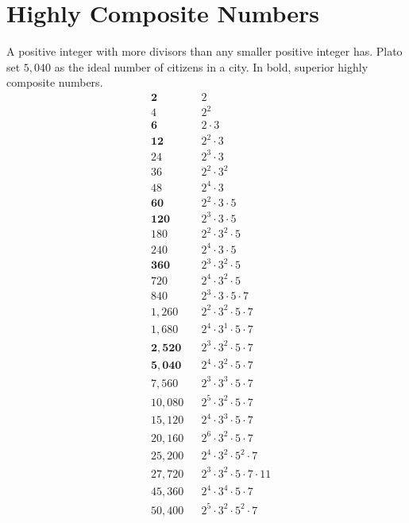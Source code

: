 \documentclass[12pt]{article}
\begin{document}
\newpage
\section*{Highly Composite Numbers}
A positive integer with more divisors than any smaller positive integer has.  Plato set $5,040$ as the ideal number of citizens in a city. In bold, superior highly composite numbers.  
\begin{align*}
& \bm{2}       &&	2\\
& 4 	         && 2^{2}\\
& \bm{6}       && 2 \cdot 3\\
& \bm{12}      && 2^{2} \cdot 3\\
& 24 	         && 2^{3} \cdot 3 \\
& 36 	         && 2^{2} \cdot 3^{2} \\
& 48 	         && 2^{4} \cdot 3 \\
& \bm{60}	     && 2^{2} \cdot 3 \cdot 5\\
& \bm{120}     && 2^{3} \cdot 3 \cdot 5\\
& 180          && 2^{2} \cdot 3^{2} \cdot 5\\
& 240 	       && 2^{4} \cdot 3 \cdot 5\\
& \bm{360}     && 2^{3} \cdot 3^{2} \cdot 5\\
& 720 	       && 2^{4} \cdot 3^{2} \cdot 5\\
& 840 	       && 2^{3} \cdot 3 \cdot 5 \cdot 7\\
& 1,260 	     && 2^{2} \cdot 3^{2} \cdot 5 \cdot 7\\
& 1,680 	     && 2^{4} \cdot 3^{1} \cdot 5 \cdot 7\\
& \bm{2,520}   && 2^{3} \cdot 3^{2} \cdot 5 \cdot 7\\
& \bm{5,040}   && 2^{4} \cdot 3^{2} \cdot 5 \cdot 7\\
& 7,560 	     && 2^{3} \cdot 3^{3} \cdot 5 \cdot 7\\
& 10,080       && 2^{5} \cdot 3^{2} \cdot 5 \cdot 7\\
& 15,120	     && 2^{4} \cdot 3^{3} \cdot 5 \cdot 7\\
& 20,160	     && 2^{6} \cdot 3^{2} \cdot 5 \cdot 7\\
& 25,200	     && 2^{4} \cdot 3^{2} \cdot 5^{2} \cdot 7\\
& 27,720	     && 2^{3} \cdot 3^{2} \cdot 5 \cdot 7 \cdot 11\\
& 45,360	     && 2^{4} \cdot 3^{4} \cdot 5 \cdot 7\\
& 50,400	     && 2^{5} \cdot 3^{2} \cdot 5^{2} \cdot 7\\

\end{align*}
\end{document}
